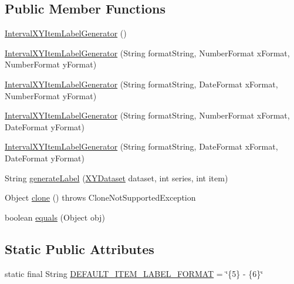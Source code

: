 \subsection*{Public Member Functions}
\begin{DoxyCompactItemize}
\item 
\mbox{\hyperlink{classorg_1_1jfree_1_1chart_1_1labels_1_1_interval_x_y_item_label_generator_ac4fe566347dde57484028ca445fec49f}{Interval\+X\+Y\+Item\+Label\+Generator}} ()
\item 
\mbox{\hyperlink{classorg_1_1jfree_1_1chart_1_1labels_1_1_interval_x_y_item_label_generator_aaddadbd94a31287404bb7645bb409c0f}{Interval\+X\+Y\+Item\+Label\+Generator}} (String format\+String, Number\+Format x\+Format, Number\+Format y\+Format)
\item 
\mbox{\hyperlink{classorg_1_1jfree_1_1chart_1_1labels_1_1_interval_x_y_item_label_generator_af29ea6bc7f5753d3d0673d9090edb48c}{Interval\+X\+Y\+Item\+Label\+Generator}} (String format\+String, Date\+Format x\+Format, Number\+Format y\+Format)
\item 
\mbox{\hyperlink{classorg_1_1jfree_1_1chart_1_1labels_1_1_interval_x_y_item_label_generator_adc73f11ed31f4c24b9ec8b186341d988}{Interval\+X\+Y\+Item\+Label\+Generator}} (String format\+String, Number\+Format x\+Format, Date\+Format y\+Format)
\item 
\mbox{\hyperlink{classorg_1_1jfree_1_1chart_1_1labels_1_1_interval_x_y_item_label_generator_a1a594090d6237fc2d90bd437e9de9f73}{Interval\+X\+Y\+Item\+Label\+Generator}} (String format\+String, Date\+Format x\+Format, Date\+Format y\+Format)
\item 
String \mbox{\hyperlink{classorg_1_1jfree_1_1chart_1_1labels_1_1_interval_x_y_item_label_generator_afad6566698a58ee2bcba885ae65e4421}{generate\+Label}} (\mbox{\hyperlink{interfaceorg_1_1jfree_1_1data_1_1xy_1_1_x_y_dataset}{X\+Y\+Dataset}} dataset, int series, int item)
\item 
Object \mbox{\hyperlink{classorg_1_1jfree_1_1chart_1_1labels_1_1_interval_x_y_item_label_generator_ab73419837c21c3d03dc1692f6ff602a1}{clone}} ()  throws Clone\+Not\+Supported\+Exception 
\item 
boolean \mbox{\hyperlink{classorg_1_1jfree_1_1chart_1_1labels_1_1_interval_x_y_item_label_generator_aefb6466b720f461c0175fc048e7a5684}{equals}} (Object obj)
\end{DoxyCompactItemize}
\subsection*{Static Public Attributes}
\begin{DoxyCompactItemize}
\item 
static final String \mbox{\hyperlink{classorg_1_1jfree_1_1chart_1_1labels_1_1_interval_x_y_item_label_generator_a4f5c9c3a857535f4deeaeb352b1b7c61}{D\+E\+F\+A\+U\+L\+T\+\_\+\+I\+T\+E\+M\+\_\+\+L\+A\+B\+E\+L\+\_\+\+F\+O\+R\+M\+AT}} = \char`\"{}\{5\} -\/ \{6\}\char`\"{}
\end{DoxyCompactItemize}
